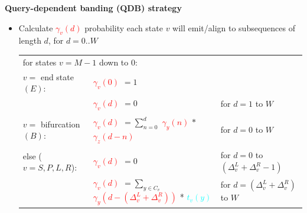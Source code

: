 \documentclass[landscape]{slides}
\begin{document}
\begin{slide}
\begin{center}
\textbf{Query-dependent banding (QDB) strategy}
\end{center}

\tiny
\begin{itemize}
\item
Calculate \textcolor{red}{$\gamma_v(d)$} probability each state $v$ will emit/align to
subsequences of length $d$, for $d = 0..W$

\begin{tabular}{l|l|l}
\multicolumn{3}{l}{for states $v = M-1$ down to $0$:} \\
$v = $ end state $(E)$: & \textcolor{red}{$\gamma_v(0)$} $= 1$ & \\
                        & \textcolor{red}{$\gamma_v(d)$} $= 0$ & for $d=1$ to $W$ \\
& & \\
$v = $ bifurcation $(B)$: & \textcolor{red}{$\gamma_v(d)$} $= \sum_{n=0}^{d}$ \textcolor{red}{$\gamma_y(n)$}
$*$ \textcolor{red}{$\gamma_z(d-n)$} & for $d = 0$ to $W$ \\
& & \\
else ($v = S, P, L, R$): & \textcolor{red}{$\gamma_v(d)$} $= 0$ & for $d=0$ to $(\Delta_v^{L} + \Delta_v^{R} -
1)$ \\
& \textcolor{red}{$\gamma_v(d)$} $= \sum_{y \in C_v}$ \textcolor{red}{$\gamma_y(d-(\Delta_v^{L} + \Delta_v^{R}))$} * \textcolor{cyan}{$t_v(y)$}
& for $d = (\Delta_v^{L} + \Delta_v^{R})$ to $W$ \\
\end{tabular}

\end{itemize}

\vfill
\end{slide}
%
\end{document}
